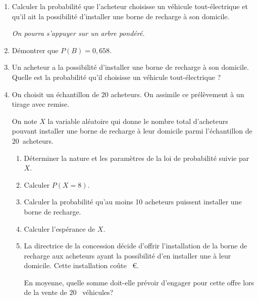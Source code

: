 \begin{enumerate}
\item Calculer la probabilité que l'acheteur choisisse un véhicule tout-électrique et qu'il ait la possibilité d'installer une borne de recharge à son domicile.

\emph{On pourra s'appuyer sur un arbre pondéré.}
\item Démontrer que $P(B) = 0,658$.
\item Un acheteur a la possibilité d'installer une borne de recharge à son domicile. Quelle
est la probabilité qu'il choisisse un véhicule tout-électrique ?
\item On choisit un échantillon de $20$ acheteurs. On assimile ce prélèvement à un tirage avec remise.

On note $X$ la variable aléatoire qui donne le nombre total d'acheteurs pouvant installer une borne de recharge à leur domicile parmi l'échantillon de $20$~acheteurs.
	\begin{enumerate}
		\item Déterminer la nature et les paramètres de la loi de probabilité suivie par $X$.
		\item Calculer $P(X = 8)$.
		\item Calculer la probabilité qu'au moins 10 acheteurs puissent installer une borne de recharge.
		\item Calculer l'espérance de $X$.
		\item La directrice de la concession décide d'offrir l'installation de la borne de recharge aux acheteurs ayant la possibilité d'en installer une à leur domicile. Cette installation coûte ~\euro.
		
En moyenne, quelle somme doit-elle prévoir d'engager pour cette offre lors de la vente de $20$ ~véhicules?
	\end{enumerate}
\end{enumerate}
